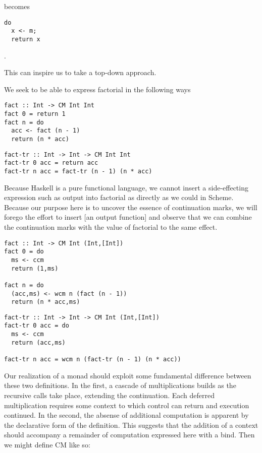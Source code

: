 \documentclass[ms,electronic,twosidetoc,letterpaper,chaptercenter,parttop]{byumsphd}
\begin{document}
becomes

\begin{verbatim}
do
  x <- m;
  return x
\end{verbatim}.

This can inspire us to take a top-down approach.

We seek to be able to express factorial in the following ways

\begin{verbatim}
fact :: Int -> CM Int Int
fact 0 = return 1
fact n = do
  acc <- fact (n - 1)
  return (n * acc)
\end{verbatim}

\begin{verbatim}
fact-tr :: Int -> Int -> CM Int Int
fact-tr 0 acc = return acc
fact-tr n acc = fact-tr (n - 1) (n * acc)
\end{verbatim}

Because Haskell is a pure functional language, we cannot insert a 
side-effecting expression such as output into factorial as directly as we 
could in Scheme. Because our purpose here is to uncover the essence of 
continuation marks, we will forego the effort to insert [an output function] 
and observe that we can combine the continuation marks with the value of 
factorial to the same effect.

\begin{verbatim}
fact :: Int -> CM Int (Int,[Int])
fact 0 = do
  ms <- ccm
  return (1,ms)

fact n = do
  (acc,ms) <- wcm n (fact (n - 1))
  return (n * acc,ms)
\end{verbatim}

\begin{verbatim}
fact-tr :: Int -> Int -> CM Int (Int,[Int])
fact-tr 0 acc = do
  ms <- ccm
  return (acc,ms)

fact-tr n acc = wcm n (fact-tr (n - 1) (n * acc))
\end{verbatim}

Our realization of a monad should exploit some fundamental difference 
between these two definitions. In the first, a cascade of multiplications 
builds as the recursive calls take place, extending the continuation. Each 
deferred multiplication requires some context to which control can return 
and execution continued. In the second, the absense of additional computation 
is apparent by the declarative form of the definition. This suggests that 
the addition of a context should accompany a remainder of computation 
expressed here with a bind. Then we might define CM like so:
\end{document}
